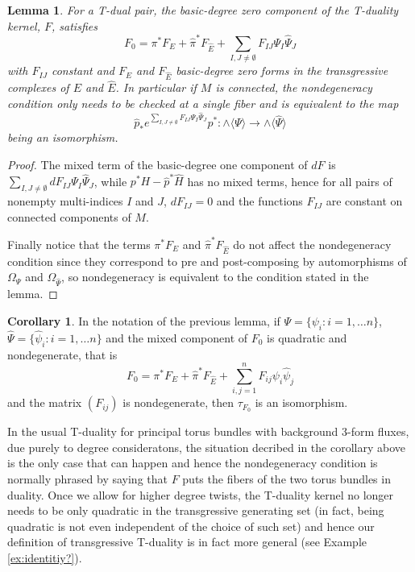 \documentclass[12pt,twoside]{article}
\theoremstyle{plain}
\newtheorem{lemma}[theorem]{Lemma}%
\theoremstyle{definition}
\newtheorem{corollary}[theorem]{Corollary}%
\newcommand{\IP}[1]{\langle #1 \rangle}
\numberwithin{equation}{section}
\begin{document}
\begin{lemma}\label{lem:basic-degree zero part}
For a T-dual pair, the basic-degree zero component of the T-duality kernel, $F$, satisfies
\[F_0 = \pi^*F_E + \hat\pi^*F_{\hat{E}} + \sum_{I,J\neq \emptyset}F_{IJ}\Psi_I\hat{\Psi}_J\]
with    $F_{IJ}$ constant and $F_E$ and $F_{\hat{E}}$ basic-degree zero forms in the transgressive complexes of $E$ and $\hat{E}$. In particular if $M$ is connected, the nondegeneracy condition only needs to be checked at a single fiber and is equivalent to the map
\[\hat{p}_*e^{\sum_{I,J\neq \emptyset}F_{IJ}\Psi_I\hat{\Psi}_J}p^*\colon \wedge \IP{\Psi} \to \wedge \IP{\hat\Psi}\]
being an isomorphism.
\end{lemma}
\begin{proof}
The mixed term of the basic-degree one component of $dF$ is  $\sum_{I,J\neq \emptyset} dF_{IJ}\Psi_I\hat{\Psi}_J $, while $p^*H - \hat{p}^*\hat{H}$ has no mixed terms, hence for all pairs of nonempty multi-indices $I$ and $J$,   $dF_{IJ}=0$ and the functions $F_{IJ}$ are constant on connected components of $M$.

Finally notice that the terms $\pi^*F_E$ and $\hat\pi^*F_{\hat{E}}$  do not affect the nondegeneracy condition since they correspond to pre and post-composing by automorphisms of $\Omega_\Psi$ and $\Omega_{\hat{\Psi}}$, so nondegeneracy is equivalent to the condition stated in the lemma.
\end{proof}

\begin{corollary}
In the notation of the previous lemma, if $\Psi = \{\psi_i\colon i=1,\dots n\}$, $\hat{\Psi} = \{\hat\psi_i\colon i=1,\dots n\}$ and the mixed component of $F_0$ is quadratic and nondegenerate, that is
\[F_0 = \pi^*F_E + \hat\pi^*F_{\hat{E}} +  \sum_{i,j=1}^n F_{ij} \psi_i \hat\psi_j\]
and the matrix $(F_{ij})$ is nondegenerate, then $\tau_{F_0}$  is an isomorphism.
\end{corollary}
In the usual T-duality for principal torus bundles  with background 3-form fluxes, due purely to degree consideratons, the situation decribed in the corollary above is the only case that can happen and hence the nondegeneracy condition is normally phrased by saying that $F$ puts the fibers of the two torus bundles in duality. Once we allow for higher degree twists, the T-duality kernel no longer needs to be only quadratic in the transgressive  generating set (in fact, being quadratic is not even independent of the choice of such set) and hence our definition of transgressive T-duality is in fact more general (see Example \ref{ex:identitiy?}).
\end{document}

